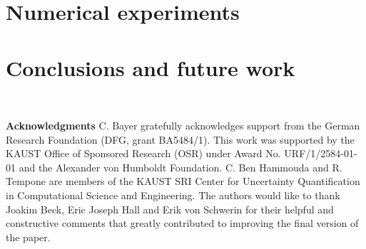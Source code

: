 \documentclass[11pt]{article}
\begin{document}
  \section{Numerical experiments}\label{sec:Numerical tests}




\section{Conclusions and future work}



\

\textbf{Acknowledgments} C. Bayer gratefully acknowledges support from the German Research Foundation (DFG, grant BA5484/1). This work was supported by the KAUST Office of Sponsored Research (OSR) under Award No. URF/1/2584-01-01 and the Alexander von Humboldt Foundation. C. Ben Hammouda and R. Tempone are members of the KAUST SRI Center for Uncertainty Quantification in Computational Science and Engineering. The authors would like to thank Joakim Beck, Eric Joseph Hall and Erik von Schwerin for their helpful and constructive comments that greatly contributed to improving the final version of the paper. 





 




%






 

 

 
 
 
\end{document}
